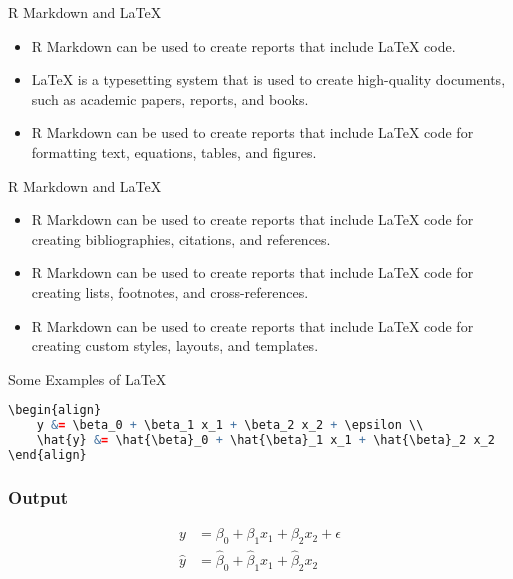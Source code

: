 \documentclass[serif, 9pt, aspectratio=32]{beamer}
\begin{document}
\begin{frame}{R Markdown and LaTeX}
    \begin{itemize}
        \setlength{\itemsep}{2em}
        \item R Markdown can be used to create reports that include LaTeX code.
        \item LaTeX is a typesetting system that is used to create high-quality documents, such as academic papers, reports, and books.
        \item R Markdown can be used to create reports that include LaTeX code for formatting text, equations, tables, and figures.
    \end{itemize}
\end{frame}

\begin{frame}{R Markdown and LaTeX}
    \begin{itemize}
        \setlength{\itemsep}{2em}
        \item R Markdown can be used to create reports that include LaTeX code for creating bibliographies, citations, and references.
        \item R Markdown can be used to create reports that include LaTeX code for creating lists, footnotes, and cross-references.
        \item R Markdown can be used to create reports that include LaTeX code for creating custom styles, layouts, and templates.
    \end{itemize}
\end{frame}

\begin{frame}[fragile]{Some Examples of LaTeX}
    \begin{lstlisting}[language=R]
\begin{align}
    y &= \beta_0 + \beta_1 x_1 + \beta_2 x_2 + \epsilon \\
    \hat{y} &= \hat{\beta}_0 + \hat{\beta}_1 x_1 + \hat{\beta}_2 x_2
\end{align}
    \end{lstlisting}
\end{frame}

\begin{frame}
    \frametitle{Output}
    \begin{align}
        y       & = \beta_0 + \beta_1 x_1 + \beta_2 x_2 + \epsilon        \\
        \hat{y} & = \hat{\beta}_0 + \hat{\beta}_1 x_1 + \hat{\beta}_2 x_2
    \end{align}
\end{frame}
\end{document}
